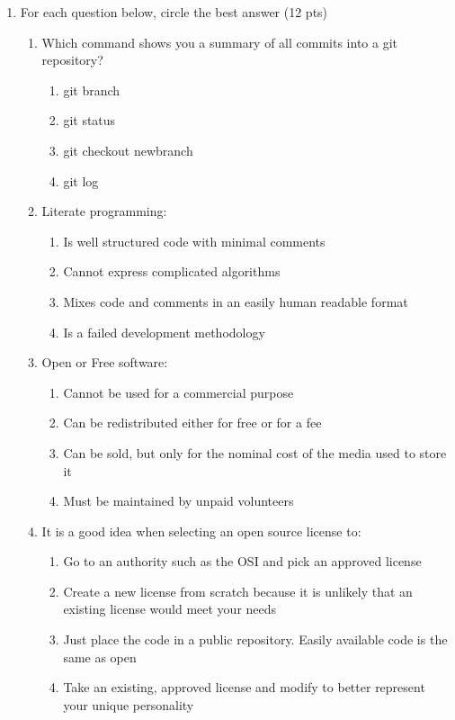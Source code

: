 \documentclass[10pt]{article}
\begin{document}
\begin{enumerate}
\begin{enumerate}
\end{enumerate}

\item For each question below, circle the best answer (12 pts)
\begin{enumerate}
	\item Which command shows you a summary of all commits into a git repository?
	\begin{enumerate}
		\item git branch
		\item git status
		\item git checkout newbranch
		\item git log
	\end{enumerate}
\newpage
 	\item Literate programming:
 	\begin{enumerate}
 		\item Is well structured code with minimal comments
 		\item Cannot express complicated algorithms
 		\item Mixes code and comments in an easily human readable format
 		\item Is a failed development methodology
 	\end{enumerate}
 	\item Open or Free software:
 	\begin{enumerate}
 		\item Cannot be used for a commercial purpose
 		\item Can be redistributed either for free or for a fee
 		\item Can be sold, but only for the nominal cost of the media used to store it
 		\item Must be maintained by unpaid volunteers
 	\end{enumerate}
 	\item It is a good idea when selecting an open source license to:
	\begin{enumerate}
		\item Go to an authority such as the OSI and pick an approved license
		\item Create a new license from scratch because it is unlikely that an existing license would meet your needs
		\item Just place the code in a public repository. Easily available code is the same as open
		\item Take an existing, approved license and modify to better represent your unique personality
	\end{enumerate}
\end{enumerate}


\end{enumerate}
\end{document}
